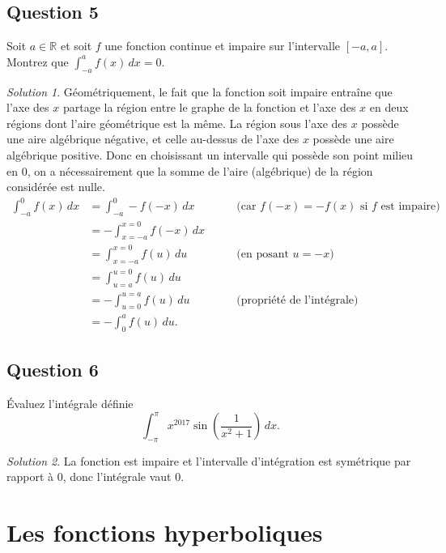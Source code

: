 \documentclass[
  12pt,
  letterpaper,
]{book}
\theoremstyle{remark}
\newtheorem*{solution}{Solution}
\begin{document}
\hypertarget{question-5-2}{%
\section{Question 5}\label{question-5-2}}

Soit \(a\in\mathbb{R}\) et soit \(f\) une fonction continue et impaire
sur l'intervalle \([-a,a]\). Montrez que \(\int_{-a}^{a}f(x)\,dx=0\).

\begin{solution}

Géométriquement, le fait que la fonction soit impaire entraîne que l'axe
des \(x\) partage la région entre le graphe de la fonction et l'axe des
\(x\) en deux régions dont l'aire géométrique est la même. La région
sous l'axe des \(x\) possède une aire algébrique négative, et celle
au-dessus de l'axe des \(x\) possède une aire algébrique positive. Donc
en choisissant un intervalle qui possède son point milieu en 0, on a
nécessairement que la somme de l'aire (algébrique) de la région
considérée est nulle. \begin{align}
\int_{-a}^{0}f(x)\,dx&=\int_{-a}^{0}-f(-x)\,dx & \qquad\text{(car $f(-x)=-f(x)$ si $f$ est impaire)} \\
&=-\int_{x=-a}^{x=0}f(-x)\,dx \\
&=\int_{x=-a}^{x=0}f(u)\,du & \qquad \text{(en posant $u=-x$)} \\
&=\int_{u=a}^{u=0}f(u)\,du \\
&=-\int_{u=0}^{u=a}f(u)\,du & \qquad \text{(propriété de l'intégrale)} \\
&=-\int_{0}^{a}f(u)\,du.
\end{align}

\end{solution}

\hypertarget{question-6-2}{%
\section{Question 6}\label{question-6-2}}

Évaluez l'intégrale définie
\[\int_{-\pi}^{\pi}x^{2017}\sin\left(\frac{1}{x^2+1}\right)\,dx.\]

\begin{solution}

La fonction est impaire et l'intervalle d'intégration est symétrique par
rapport à \(0\), donc l'intégrale vaut \(0\).

\end{solution}

\hypertarget{les-fonctions-hyperboliques-1}{%
\chapter{Les fonctions
hyperboliques}\label{les-fonctions-hyperboliques-1}}
\end{document}
